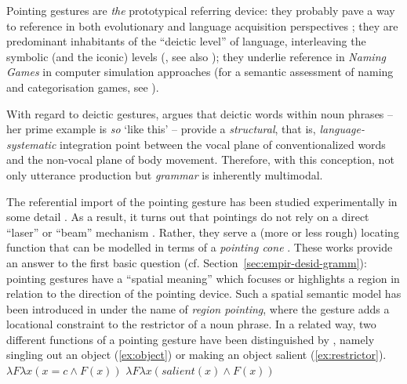\documentclass[output=paper]{langsci/langscibook}
\begin{document}
 
Pointing gestures are \emph{the} prototypical referring device:
%
they probably pave a way to reference in both evolutionary and language acquisition perspectives \citep{Bruner:1998,Masataka:2003,Matthews:Behne:Lieven:Tomasello:2012};
%
they are predominant inhabitants of the \enquote{deictic level} of language, interleaving the symbolic (and the iconic) levels (\citealp{Levinson:2008}, see also \citealp{Buehler:1934:ORIG});
%
they underlie reference in \textit{Naming Games} in computer simulation approaches \citep{Steels:1995} (for a semantic assessment of naming and categorisation games, see \citealp{Luecking:Mehler:2012}).  


With regard to deictic gestures, \citet[Sec.~5.4]{Fricke:2012} argues that deictic words  within noun phrases -- her prime example is  \emph{so} `like this' -- provide a \emph{structural}, that is, \emph{language-systematic} integration point between the vocal plane of conventionalized words and the non-vocal plane of body movement. 
%
Therefore, with this conception, not only utterance production but \emph{grammar} is inherently multimodal. 

The referential import of the pointing gesture has been studied experimentally in some detail \citep{Bangerter:Oppenheimer:2006,Kranstedt:Luecking:Pfeiffer:Rieser:Wachsmuth:2006:a,Kranstedt:Luecking:Pfeiffer:Rieser:Wachsmuth:2006:b,van:der:Sluis:Krahmer:2007}. 
%
As a result, it turns out that pointings do not rely on a direct \enquote{laser} or \enquote{beam} mechanism \citep{McGinn:1981}.
%
Rather, they serve a (more or less rough) locating function \citep{Clark:1996} that can be modelled in terms of a \emph{pointing cone} \citep{Kranstedt:Luecking:Pfeiffer:Rieser:Wachsmuth:2006:a,Luecking:Pfeiffer:Rieser:2015}. 
%
These works provide an answer to the first basic question (cf. Section~\ref{sec:empir-desid-gramm}): pointing gestures have a \enquote{spatial meaning} which focuses or highlights a region in relation to the direction of the pointing device.
%
Such a spatial semantic model has been introduced in \citet{Rieser:2004} under the name of \emph{region pointing}, where the gesture adds a locational constraint to the restrictor of a noun phrase.
%
In a related way, two different functions of a pointing gesture have been distinguished by \citet{Kuehnlein:Nimke:Stegmann:2002}, namely singling out an object (\ref{ex:object}) or making an object salient (\ref{ex:restrictor}).
%
\ea \label{ex:pointing-functions}
\ea \label{ex:object}
$\lambda F \lambda x (x = c \wedge F(x))$
\ex \label{ex:restrictor}
$\lambda F \lambda x (\textit{salient}(x) \wedge F(x))$
\z 
\z
\end{document}
